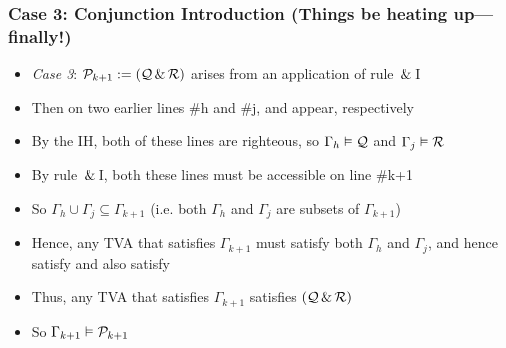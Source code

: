 \begin{frame}
\frametitle{Case 3: Conjunction Introduction \footnotesize{(Things be heating up---finally!)}}

\begin{itemize}[<+->]

\item \emph{Case 3}: $\mathcal{P}_{k +1} := (\mathcal{Q} \,\&\, \mathcal{R})$ arises from an application of rule $\,\&\,$I


\item Then on two earlier lines \#h and \#j,  and  appear, respectively

\item By the IH, both of these lines are righteous, so $\Gamma_{h} \vDash \mathcal{Q}$ and $\Gamma_{j} \vDash \mathcal{R}$

\item By rule $\,\&\,$I, both these lines must be accessible on line \#k+1

\item So $\Gamma_{h} \cup \Gamma_{j} \subseteq \Gamma_{k+1}$ (i.e. both $\Gamma_{h}$ and $\Gamma_{j}$ are subsets of $\Gamma_{k+1}$)

\item Hence, any TVA that satisfies $\Gamma_{k+1}$ must satisfy both  $\Gamma_{h}$ and $\Gamma_{j}$, and hence satisfy  and also satisfy 

\item Thus, any TVA that satisfies $\Gamma_{k+1}$ satisfies $(\mathcal{Q} \,\&\, \mathcal{R})$

\item So $\Gamma_{k+1} \vDash \mathcal{P}_{k+1}$



\end{itemize}
\end{frame}

